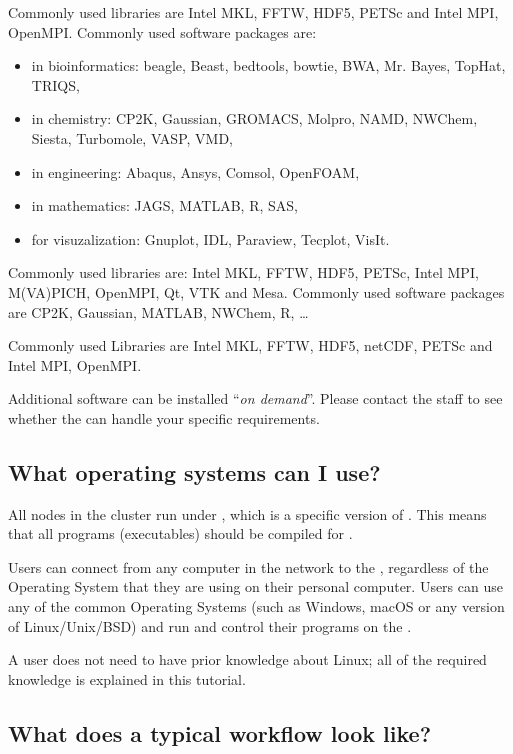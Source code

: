 Commonly used libraries are Intel MKL, FFTW, HDF5, PETSc and Intel MPI,
OpenMPI.
\fi
\ifleuven
Commonly used software packages are:
\begin{itemize}
\item{in bioinformatics: beagle, Beast, bedtools, bowtie, BWA, Mr. Bayes, TopHat, TRIQS,}
\item{in chemistry: CP2K, Gaussian, GROMACS, Molpro, NAMD, NWChem, Siesta, Turbomole, VASP, VMD,}
\item{in engineering: Abaqus, Ansys, Comsol, OpenFOAM,}
\item{in mathematics: JAGS, MATLAB, R, SAS,}
\item{for visuzalization: Gnuplot, IDL, Paraview, Tecplot, VisIt.}
\end{itemize}


Commonly used libraries are: Intel MKL, FFTW, HDF5, PETSc, Intel MPI,
M(VA)PICH, OpenMPI, Qt, VTK and Mesa.
\fi
\ifbrussel
Commonly used software packages are CP2K, Gaussian, MATLAB, NWChem, R, \ldots

Commonly used Libraries are Intel MKL, FFTW, HDF5, netCDF, PETSc and Intel MPI,
OpenMPI.
\fi

Additional software can be installed ``\emph{on demand}''. Please contact the
\hpc staff to see whether the \hpc can handle your specific requirements.

\subsection{What operating systems can I use?}
\label{sec:what-operating-systems-can-i-use}

All nodes in the \hpc cluster run under \operatingsystem, which is a specific
version of \operatingsystembase. This means that all programs (executables)
should be compiled for \operatingsystem.

Users can connect from any computer in the \university network to the
\hpc, regardless of the Operating System that they are using on their personal
computer.
Users can use any of the common Operating Systems (such as Windows, macOS or
any version of Linux/Unix/BSD) and run and control their programs on the \hpc.

A user does not need to have prior knowledge about Linux; all of the required
knowledge is explained in this tutorial.

\subsection{What does a typical workflow look like?}

